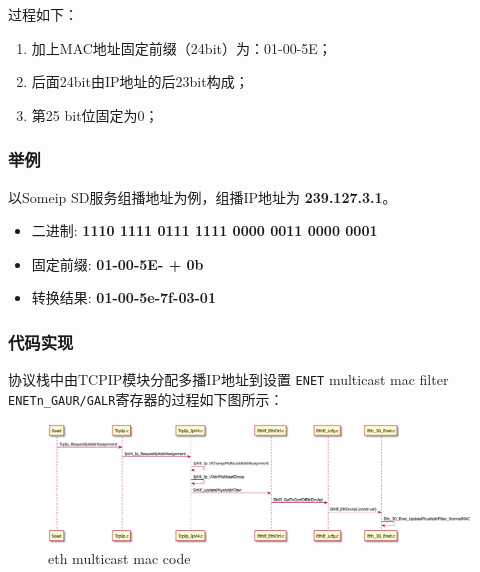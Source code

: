 过程如下：

\begin{enumerate}
    \item 加上MAC地址固定前缀（24bit）为：01-00-5E；
    \item 后面24bit由IP地址的后23bit构成；
    \item 第25 bit位固定为0；
\end{enumerate}

\subsubsection{举例}

以Someip SD服务组播地址为例，组播IP地址为 \textbf{239.127.3.1}。

\begin{itemize}
    \item 二进制: \textbf{1110 1111 0111 1111 0000 0011 0000 0001}
    \item 固定前缀: \textbf{01-00-5E- + 0b}
    \item 转换结果: \textbf{01-00-5e-7f-03-01}
\end{itemize}

\subsubsection{代码实现}

协议栈中由TCPIP模块分配多播IP地址到设置 \lstinline{ENET} multicast mac filter \lstinline{ENETn_GAUR/GALR}寄存器的过程如下图所示：

\begin{figure}[h]
    \centering
    \includegraphics[scale=0.5]{pic/eth_multicast_mac_code.pdf}
    \caption{eth multicast mac code}
    \label{fig:eth_multicast_mac_code}
\end{figure}